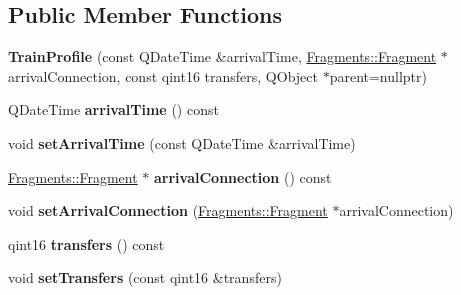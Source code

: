 \subsection*{Public Member Functions}
\begin{DoxyCompactItemize}
\item 
\mbox{\label{classRouterEngine_1_1TrainProfile_abe728c1cb1f8a8e280b6700beed6296c}} 
{\bfseries Train\+Profile} (const Q\+Date\+Time \&arrival\+Time, \mbox{\hyperlink{classFragments_1_1Fragment}{Fragments\+::\+Fragment}} $\ast$arrival\+Connection, const qint16 transfers, Q\+Object $\ast$parent=nullptr)
\item 
\mbox{\label{classRouterEngine_1_1TrainProfile_a1b691f0fa3e969ecfd8693e0b1b5c6b7}} 
Q\+Date\+Time {\bfseries arrival\+Time} () const
\item 
\mbox{\label{classRouterEngine_1_1TrainProfile_a0fdb44416f8eb5298174516f33b8afaf}} 
void {\bfseries set\+Arrival\+Time} (const Q\+Date\+Time \&arrival\+Time)
\item 
\mbox{\label{classRouterEngine_1_1TrainProfile_a58a6062ec5bac5ae68b4e7b3cc9536b3}} 
\mbox{\hyperlink{classFragments_1_1Fragment}{Fragments\+::\+Fragment}} $\ast$ {\bfseries arrival\+Connection} () const
\item 
\mbox{\label{classRouterEngine_1_1TrainProfile_ad8087ee9128e34f41c28396036cb1999}} 
void {\bfseries set\+Arrival\+Connection} (\mbox{\hyperlink{classFragments_1_1Fragment}{Fragments\+::\+Fragment}} $\ast$arrival\+Connection)
\item 
\mbox{\label{classRouterEngine_1_1TrainProfile_aa92906e1a0aed20b6e4d141bc3b4f418}} 
qint16 {\bfseries transfers} () const
\item 
\mbox{\label{classRouterEngine_1_1TrainProfile_a4250ad7dd40ebaf9c37ba4c89824118b}} 
void {\bfseries set\+Transfers} (const qint16 \&transfers)
\end{DoxyCompactItemize}
